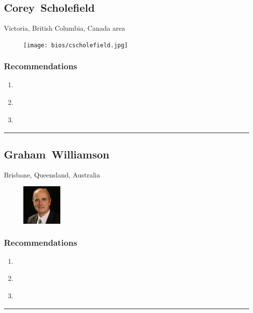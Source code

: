 \subsection{Corey~Scholefield} \textsf{Victoria, British Columbia, Canada area} \par \setlength{\columnsep}{0pt} \begin{figure} \centering \texttt{[image: bios/cscholefield.jpg]} \end{figure}  \subsubsection{Recommendations}\begin{enumerate}
\item \cite{Hazelton2015}
\item \cite{Prasad2012}
\item \cite{Windley2005}
\end{enumerate}\noindent\rule{\textwidth}{0.2pt}

\subsection{Graham~Williamson} \textsf{Brisbane, Queensland, Australia} \par \setlength{\columnsep}{0pt} \begin{figure} \centering \includegraphics[width=0.18\textwidth]{bios/gwilliamson.jpg} \end{figure}  \subsubsection{Recommendations}\begin{enumerate}
\item \cite{DTA-AUS2018}
\item \cite{NIST-USA2017}
\item \cite{Williamson2017}
\end{enumerate}\noindent\rule{\textwidth}{0.2pt}

